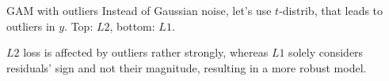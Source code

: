 \documentclass[11pt,compress,t,notes=noshow, xcolor=table]{beamer}
\begin{document}

\begin{frame}{GAM with outliers}
Instead of Gaussian noise, let's use $t$-distrib, that leads 
to outliers in $y$.
Top: $L2$, bottom: $L1$.

\vfill


\vfill

\footnotesize

$L2$ loss is affected by outliers rather strongly, whereas $L1$ solely considers 
residuals' sign and not their magnitude, resulting in a more robust model.

\end{frame}

\end{document}
